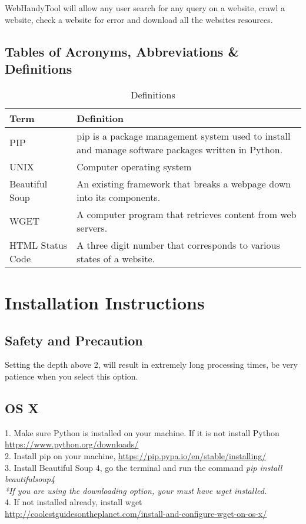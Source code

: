 \documentclass[12pt, titlepage]{article}
\begin{document}
WebHandyTool will allow any user search for any query on a website, crawl a website, check a website for error and download all the websites resources.

\subsection{Tables of Acronyms, Abbreviations \& Definitions}

\begin{table}[h!]
\centering
\begin{tabular}{| p{3cm} | p{10cm} |}    \hline
	Term &Definition\\ \hline
	PIP & pip is a package management system used to install and manage software packages written in Python.\\ \hline
	UNIX &Computer operating system\\ \hline
	Beautiful Soup & An existing framework that breaks a webpage down into its components.\\ \hline
	WGET & A computer program that retrieves content from web servers.\\ \hline
	HTML Status Code & A three digit number that corresponds to various states of a website.
\end{tabular}
\caption{Definitions}
\label{table:Definitions}
\end{table}


\pagebreak

\section{Installation Instructions}

\subsection{Safety and Precaution}
Setting the depth above 2, will result in extremely long processing times, be very patience when you select this option.

\subsection{OS X}
1. Make sure Python is installed on your machine. If it is not install Python \url{https://www.python.org/downloads/}\\
2. Install pip on your machine,  \url{https://pip.pypa.io/en/stable/installing/}\\
3. Install Beautiful Soup 4, go the terminal and run the command \textit{pip install beautifulsoup4}\\
\textit{*If you are using the downloading option, your must have wget installed.}\\
4. If not installed already, install wget  \url{http://coolestguidesontheplanet.com/install-and-configure-wget-on-os-x/}\\
\end{document}
